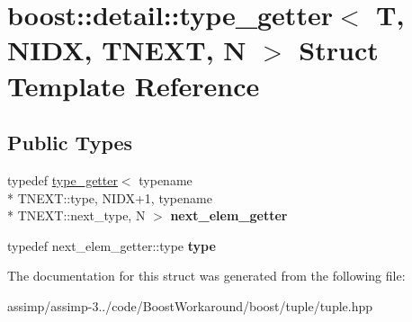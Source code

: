 \hypertarget{structboost_1_1detail_1_1type__getter}{\section{boost\+:\+:detail\+:\+:type\+\_\+getter$<$ T, N\+I\+D\+X, T\+N\+E\+X\+T, N $>$ Struct Template Reference}
\label{structboost_1_1detail_1_1type__getter}
}
\subsection*{Public Types}
\begin{DoxyCompactItemize}
\item 
\hypertarget{structboost_1_1detail_1_1type__getter_abc0eb5355b43f173bf1e1566aabf1ac4}{typedef \hyperlink{structboost_1_1detail_1_1type__getter}{type\+\_\+getter}$<$ typename \\*
T\+N\+E\+X\+T\+::type, N\+I\+D\+X+1, typename \\*
T\+N\+E\+X\+T\+::next\+\_\+type, N $>$ {\bfseries next\+\_\+elem\+\_\+getter}}\label{structboost_1_1detail_1_1type__getter_abc0eb5355b43f173bf1e1566aabf1ac4}

\item 
\hypertarget{structboost_1_1detail_1_1type__getter_ae3846f939847b7321585f0484f8d7163}{typedef next\+\_\+elem\+\_\+getter\+::type {\bfseries type}}\label{structboost_1_1detail_1_1type__getter_ae3846f939847b7321585f0484f8d7163}

\end{DoxyCompactItemize}


The documentation for this struct was generated from the following file\+:\begin{DoxyCompactItemize}
\item 
assimp/assimp-\/3../code/\+Boost\+Workaround/boost/tuple/tuple.\+hpp\end{DoxyCompactItemize}
